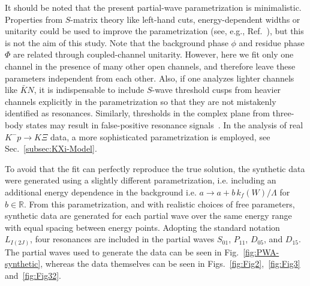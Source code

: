 \documentclass[10pt,aps,prc,superscriptaddress,twoside,twocolumn,nofootinbib,showpacs,preprintnumbers]{revtex4-1}
\begin{document}
It should be noted that the present partial-wave parametrization is minimalistic. Properties from $S$-matrix theory like left-hand cuts, energy-dependent widths or unitarity could be used to improve the parametrization (see, e.g., Ref.~\cite{Doring:2009yv}), but this is not the aim of this study. Note that the background phase $\phi$ and residue phase $\Phi$ are related through coupled-channel unitarity. However, here we fit only one channel in the presence of many other open channels, and
therefore
leave these parameters independent from each other.
Also, if one analyzes lighter channels like $\bar KN$, it is indispensable to include $S$-wave threshold cusps from heavier channels explicitly in the parametrization so that they are not mistakenly identified as resonances. Similarly, thresholds in the complex plane from three-body states may result in false-positive resonance signals~\cite{Ceci:2011ae}. In the analysis of real $K^-p\to K\Xi$ data, a more sophisticated parametrization is employed, see Sec.~\ref{subsec:KXi-Model}.

To avoid that the fit can perfectly reproduce the true solution, the synthetic data were generated using a slightly different parametrization, i.e. including an additional energy dependence in the background i.e. $a\to a+b\,k_f(W)/\Lambda$ for $b\in \mathbb{R}$. From this parametrization, and with realistic choices of free parameters, synthetic data are generated for each partial wave over the same energy range with equal spacing between energy points. Adopting the standard notation $L_{I(2J)}$, four resonances are included in the partial waves $S_{01}$, $P_{11}$, $D_{05}$, and $D_{15}$. The partial waves used to generate the data can be seen in Fig.~\ref{fig:PWA-synthetic}, whereas the data themselves can be seen in Figs.~\ref{fig:Fig2},~\ref{fig:Fig3} and~\ref{fig:Fig32}.


\end{document}
